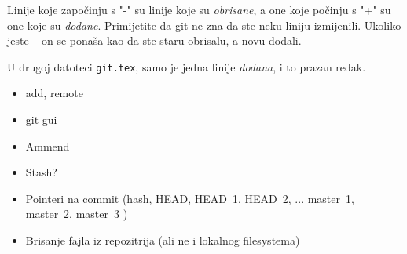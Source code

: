 Linije koje započinju s "-" su linije koje su \emph{obrisane}, a one koje počinju s "+" su one koje su \emph{dodane}. 
Primijetite da git ne zna da ste neku liniju izmijenili. 
Ukoliko jeste -- on se ponaša kao da ste staru obrisalu, a novu dodali.

U drugoj datoteci \verb+git.tex+, samo je jedna linije \emph{dodana}, i to prazan redak.

\begin{itemize}
   \item add, remote
   \item git gui
   \item Ammend
   \item Stash?
   \item Pointeri na commit (hash, HEAD, HEAD~1, HEAD~2, ... master~1, master~2, master~3 )
   \item Brisanje fajla iz repozitrija (ali ne i lokalnog filesystema)
\end{itemize}


